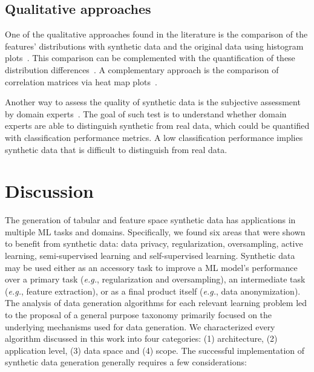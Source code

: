 \documentclass[parskip=full]{scrartcl}
\begin{document}
\subsection{Qualitative approaches}

One of the qualitative approaches found in the literature is the comparison of
the features' distributions with synthetic data and the original data using
histogram plots~\cite{hittmeir2019utility}. This comparison can be
complemented with the quantification of these distribution
differences~\cite{el2020seven}. A complementary approach is the comparison of
correlation matrices via heat map plots~\cite{hittmeir2019utility}.

Another way to assess the quality of synthetic data is the subjective
assessment by domain experts~\cite{el2020seven}. The goal of such test is to
understand whether domain experts are able to distinguish synthetic from real
data, which could be quantified with classification performance metrics. A low
classification performance implies synthetic data that is difficult to
distinguish from real data.

\section{Discussion}\label{sec:discussion}

The generation of tabular and feature space synthetic data has applications in
multiple ML tasks and domains. Specifically, we found six areas that were
shown to benefit from synthetic data: data privacy, regularization,
oversampling, active learning, semi-supervised learning and self-supervised
learning. Synthetic data may be used either as an accessory task to improve a
ML model's performance over a primary task (\textit{e.g.}, regularization and
oversampling), an intermediate task (\textit{e.g.}, feature extraction), or as
a final product itself (\textit{e.g.}, data anonymization). The analysis of
data generation algorithms for each relevant learning problem led to the
proposal of a general purpose taxonomy primarily focused on the underlying
mechanisms used for data generation. We characterized every algorithm
discussed in this work into four categories: (1) architecture, (2) application
level, (3) data space and (4) scope. The successful implementation of
synthetic data generation generally requires a few considerations:
\end{document}
